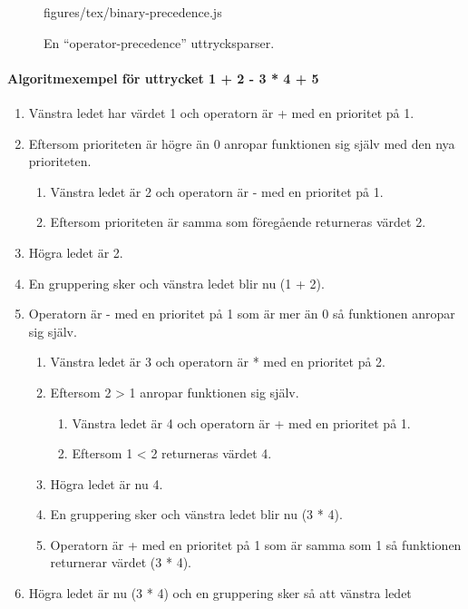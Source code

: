 \begin{figure}[ht]
    {figures/tex/binary-precedence.js}
  \caption{En ``operator-precedence'' uttrycksparser.}
  \label{fig:binprecedence}
\end{figure}

\paragraph{Algoritmexempel för uttrycket 1 + 2 - 3 * 4 + 5}

\begin{enumerate}\itemsep1pt \parskip0pt 
  \item Vänstra ledet har värdet 1 och operatorn är + med en prioritet på 1.
  \item Eftersom prioriteten är högre än 0 anropar funktionen sig själv med den
    nya prioriteten.
    \begin{enumerate}
      \item Vänstra ledet är 2 och operatorn är - med en prioritet på 1.
      \item Eftersom prioriteten är samma som föregående returneras värdet 2.
    \end{enumerate}
  \item Högra ledet är 2.
  \item En gruppering sker och vänstra ledet blir nu (1 + 2).
  \item Operatorn är - med en prioritet på 1 som är mer än 0 så funktionen
    anropar sig själv.
    \begin{enumerate}
      \item Vänstra ledet är 3 och operatorn är * med en prioritet på 2.
      \item Eftersom 2 > 1 anropar funktionen sig själv.
      \begin{enumerate}
        \item Vänstra ledet är 4 och operatorn är + med en prioritet på 1.
        \item Eftersom 1 < 2 returneras värdet 4.
      \end{enumerate}
      \item Högra ledet är nu 4.
      \item En gruppering sker och vänstra ledet blir nu (3 * 4).
      \item Operatorn är + med en prioritet på 1 som är samma som 1 så
        funktionen returnerar värdet (3 * 4).
    \end{enumerate}
  \item Högra ledet är nu (3 * 4) och en gruppering sker så att vänstra ledet

\end{enumerate}
